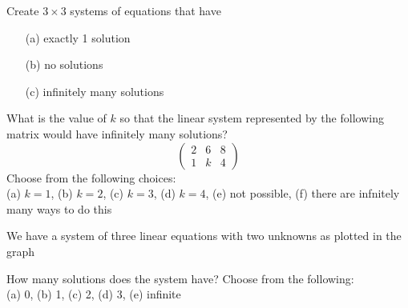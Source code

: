 % 

\begin{problem}
    Create $3\times 3$ systems of equations that have
    \begin{enumerate}
        \item[(a)] exactly 1 solution
        \item[(b)] no solutions
        \item[(c)] infinitely many solutions
    \end{enumerate}
\end{problem}

\begin{problem}
    What is the value of $k$ so that the linear system represented by the following matrix
    would have infinitely many solutions?
    \[ \left( \begin{array}{cc|c} 2 & 6 & 8 \\ 1 & k & 4 \end{array} \right) \]
    Choose from the following choices:\\
    (a) $k=1$, \quad (b) $k=2$, \quad (c) $k=3$, \quad (d) $k=4$, \quad (e) not possible,
    \quad (f) there are infnitely many ways to do this
\end{problem}

% 
%             
% 

\begin{problem}
We have a system of three linear equations with two unknowns as plotted in the graph

    \begin{minipage}{0.45\columnwidth}
        How many solutions does the system have?  Choose from the following: \\
        (a) 0, \quad (b) 1, \quad (c) 2, \quad (d) 3, \quad (e) infinite
    \end{minipage}
    \begin{minipage}{0.5\columnwidth}
        \begin{center}
        \end{center}
    \end{minipage}

\end{problem}

